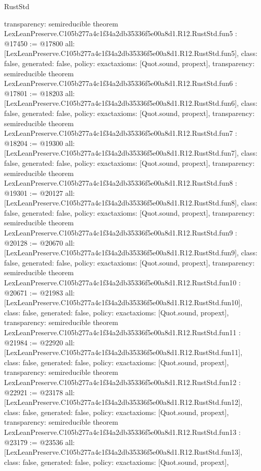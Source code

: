 \begin{lexlean}{RustStd}
\begin{coremodule}
{  transparency: semireducible
}
theorem LexLeanPreserve.C105b277a4c1f34a2db35336f5e00a8d1.R12.RustStd.fun5 : @17450 := @17800 {
  all: [LexLeanPreserve.C105b277a4c1f34a2db35336f5e00a8d1.R12.RustStd.fun5],
  class: false,
  generated: false,
  policy: exact{axioms: [Quot.sound, propext]},
  transparency: semireducible
}
theorem LexLeanPreserve.C105b277a4c1f34a2db35336f5e00a8d1.R12.RustStd.fun6 : @17801 := @18203 {
  all: [LexLeanPreserve.C105b277a4c1f34a2db35336f5e00a8d1.R12.RustStd.fun6],
  class: false,
  generated: false,
  policy: exact{axioms: [Quot.sound, propext]},
  transparency: semireducible
}
theorem LexLeanPreserve.C105b277a4c1f34a2db35336f5e00a8d1.R12.RustStd.fun7 : @18204 := @19300 {
  all: [LexLeanPreserve.C105b277a4c1f34a2db35336f5e00a8d1.R12.RustStd.fun7],
  class: false,
  generated: false,
  policy: exact{axioms: [Quot.sound, propext]},
  transparency: semireducible
}
theorem LexLeanPreserve.C105b277a4c1f34a2db35336f5e00a8d1.R12.RustStd.fun8 : @19301 := @20127 {
  all: [LexLeanPreserve.C105b277a4c1f34a2db35336f5e00a8d1.R12.RustStd.fun8],
  class: false,
  generated: false,
  policy: exact{axioms: [Quot.sound, propext]},
  transparency: semireducible
}
theorem LexLeanPreserve.C105b277a4c1f34a2db35336f5e00a8d1.R12.RustStd.fun9 : @20128 := @20670 {
  all: [LexLeanPreserve.C105b277a4c1f34a2db35336f5e00a8d1.R12.RustStd.fun9],
  class: false,
  generated: false,
  policy: exact{axioms: [Quot.sound, propext]},
  transparency: semireducible
}
theorem LexLeanPreserve.C105b277a4c1f34a2db35336f5e00a8d1.R12.RustStd.fun10 : @20671 := @21983 {
  all: [LexLeanPreserve.C105b277a4c1f34a2db35336f5e00a8d1.R12.RustStd.fun10],
  class: false,
  generated: false,
  policy: exact{axioms: [Quot.sound, propext]},
  transparency: semireducible
}
theorem LexLeanPreserve.C105b277a4c1f34a2db35336f5e00a8d1.R12.RustStd.fun11 : @21984 := @22920 {
  all: [LexLeanPreserve.C105b277a4c1f34a2db35336f5e00a8d1.R12.RustStd.fun11],
  class: false,
  generated: false,
  policy: exact{axioms: [Quot.sound, propext]},
  transparency: semireducible
}
theorem LexLeanPreserve.C105b277a4c1f34a2db35336f5e00a8d1.R12.RustStd.fun12 : @22921 := @23178 {
  all: [LexLeanPreserve.C105b277a4c1f34a2db35336f5e00a8d1.R12.RustStd.fun12],
  class: false,
  generated: false,
  policy: exact{axioms: [Quot.sound, propext]},
  transparency: semireducible
}
theorem LexLeanPreserve.C105b277a4c1f34a2db35336f5e00a8d1.R12.RustStd.fun13 : @23179 := @23536 {
  all: [LexLeanPreserve.C105b277a4c1f34a2db35336f5e00a8d1.R12.RustStd.fun13],
  class: false,
  generated: false,
  policy: exact{axioms: [Quot.sound, propext]},
}
\end{coremodule}
\end{lexlean}
